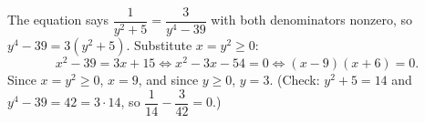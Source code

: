 The equation says $\dfrac{1}{y^2+5}=\dfrac{3}{y^4-39}$ with both denominators nonzero, so $y^4-39=3\left(y^2+5\right)$. Substitute $x=y^2\ge0$:
\[x^2-39=3x+15\iff x^2-3x-54=0\iff(x-9)(x+6)=0.\]
Since $x=y^2\ge0$, $x=9$, and since $y\ge0$, $y=\boxed{3}$. (Check: $y^2+5=14$ and $y^4-39=42=3\cdot14$, so $\dfrac1{14}-\dfrac3{42}=0$.)
